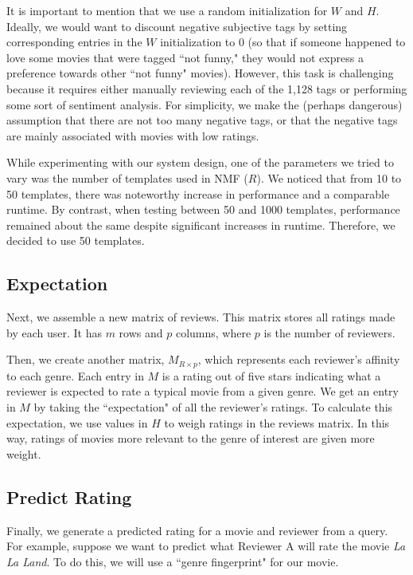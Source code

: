 \documentclass[letterpaper, 10 pt, conference]{ieeeconf}  %
\begin{document}
It is important to mention that we use a random initialization for $W$ and $H$. Ideally, we would want to discount negative subjective tags by setting corresponding entries in the $W$ initialization to 0 (so that if someone happened to love some movies that were tagged ``not funny," they would not express a preference towards other ``not funny" movies). However, this task is challenging because it requires either manually reviewing each of the 1,128 tags or performing some sort of sentiment analysis. For simplicity, we make the (perhaps dangerous) assumption that there are not too many negative tags, or that the negative tags are mainly associated with movies with low ratings.

While experimenting with our system design, one of the parameters we tried to vary was the number of templates used in NMF ($R$). We noticed that from 10 to 50 templates, there was noteworthy increase in performance and a comparable runtime. By contrast, when testing between 50 and 1000 templates, performance remained about the same despite significant increases in runtime. Therefore, we decided to use 50 templates.

\smallbreak
\subsection{Expectation}

Next, we assemble a new matrix of reviews. This matrix stores all ratings made by each user. It has $m$ rows and $p$ columns, where $p$ is the number of reviewers.

Then, we create another matrix, $M_{R \times p}$, which represents each reviewer's affinity to each genre. Each entry in $M$ is a rating out of five stars indicating what a reviewer is expected to rate a typical movie from a given genre.
We get an entry in $M$ by taking the ``expectation" of all the reviewer's ratings. To calculate this expectation, we use values in $H$ to weigh ratings in the reviews matrix. In this way, ratings of movies more relevant to the genre of interest are given more weight.

\subsection{Predict Rating}
Finally, we generate a predicted rating for a movie and reviewer from a query. For example, suppose we want to predict what Reviewer A will rate the movie \textit{La La Land}. To do this, we will use a ``genre fingerprint" for our movie.
\end{document}
